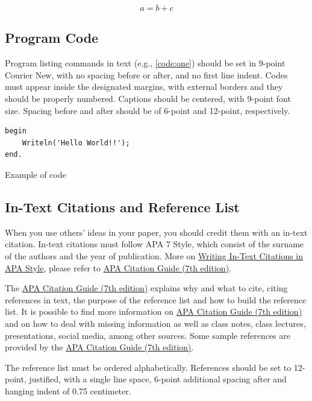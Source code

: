 \documentclass[english, spanish, brazilian]{RBIEarticle} %
\begin{document}
\begin{equation}
	a = b + c
	\label{eq:one}
\end{equation}


\subsection{Program Code}
Program listing commands in text (e.g., \autoref{code:one}) should be set in 9-point Courier New, with no spacing before or after, and no first line indent. Codes must appear inside the designated margins, with external borders and they should be properly numbered. Captions should be centered, with 9-point font size. Spacing before and after should be of 6-point and 12-point, respectively.

\begin{code}[h]
	\begin{lstlisting}
begin
    Writeln('Hello World!!');
end.
	\end{lstlisting}
	\caption{Example of code}
	\label{code:one}
\end{code}


\subsection{In-Text Citations and Reference List}

When you use others' ideas in your paper, you should credit them with an in-text citation. In-text citations must follow APA 7 Style, which consist of the surname of the authors and the year of publication. More on \href{https://apastyle.apa.org/}{Writing In-Text Citations in APA Style}, please refer to \href{https://libguides.brenau.edu/APA7}{APA Citation Guide (7th edition)}.

The  \href{https://libguides.brenau.edu/APA7}{APA Citation Guide (7th edition)} explains why and what to cite, citing references in text, the purpose of the reference list and how to build the reference list. It is possible to find more information on  \href{https://libguides.brenau.edu/APA7}{APA Citation Guide (7th edition)} and on how to deal with missing information as well as class notes, class lectures, presentations, social media, among other sources. Some sample references are provided by the  \href{https://libguides.brenau.edu/APA7}{APA Citation Guide (7th edition)}.

The reference list must be ordered alphabetically. References should be set to 12-point, justified, with a single line space, 6-point additional spacing after and hanging indent of 0.75 centimeter.
\end{document}
